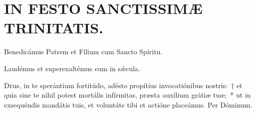 \documentclass[vesperale_romanum.tex]{subfiles}
\begin{document}

%
%
%

\section[A Trinitate ad Adventum]{IN FESTO SANCTISSIMÆ TRINITATIS.}


 \label{1_vesperis_trinitatis}





\vv Benedicámus Patrem et Fílium cum Sancto Spíritu.

\rr Laudémus et superexaltémus eum in sǽcula.







\label{or_dom_1_pp}

 \oratio

\lettrine{D}{e}us, in te sperántium fortitúdo, adésto propítius invocatiónibus nostris:~† et quia sine te nihil potest mortális infírmitas, præsta auxílium grátiæ tuæ;~* ut in exsequéndis mandátis tuis, et voluntáte tibi et actióne placeámus. Per Dóminum.

 \label{2_vesperis_trinitatis}

\label{109_1f}
{}
\end{document}
